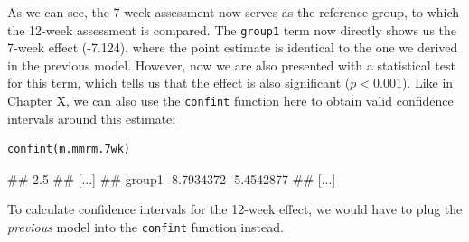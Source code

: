 As we can see, the 7-week assessment now serves as the reference group, to which the 12-week assessment is compared. The \texttt{group1} term now directly shows us the 7-week effect (-7.124), where the point estimate is identical to the one we derived in the previous model. However, now we are also presented with a statistical test for this term, which tells us that the effect is also significant ($p<$0.001). Like in Chapter X, we can also use the \texttt{confint} function here to obtain valid confidence intervals around this estimate:

\begin{lstlisting}
confint(m.mmrm.7wk)
\end{lstlisting}

\begin{example}
##                        2.5 %
## [...]
## group1            -8.7934372 -5.4542877
## [...]
\end{example}

To calculate confidence intervals for the 12-week effect, we would have to plug the \emph{previous} model into the \texttt{confint} function instead.   

